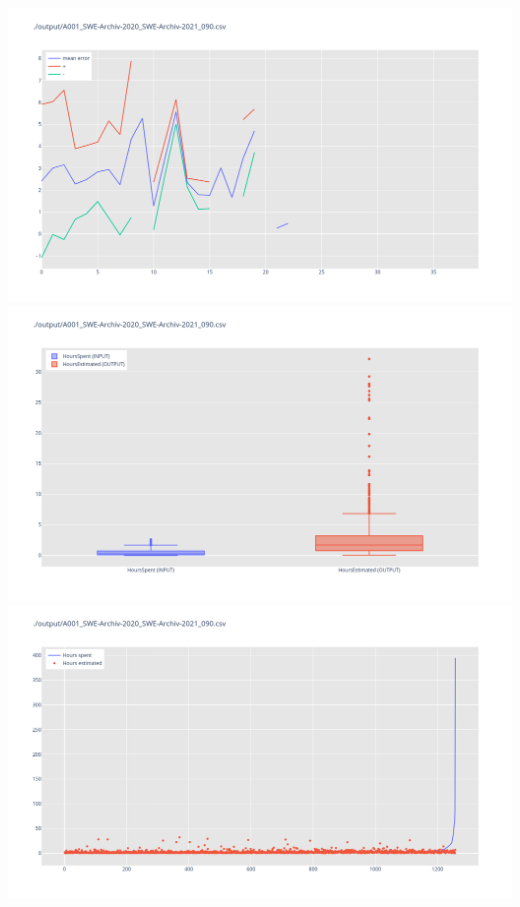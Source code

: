\includegraphics[width=\textwidth]{Scripts/output/A001_SWE-Archiv-2020_SWE-Archiv-2021_090.csv.error_distribution.png}
\includegraphics[width=\textwidth]{Scripts/output/A001_SWE-Archiv-2020_SWE-Archiv-2021_090.csv.png}
\includegraphics[width=\textwidth]{Scripts/output/A001_SWE-Archiv-2020_SWE-Archiv-2021_090.csv.scatter.png}
